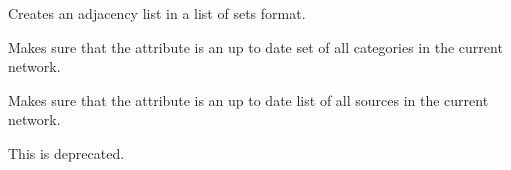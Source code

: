 \documentclass[letterpaper,10pt,english]{sphinxmanual}
\begin{document}
\begin{fulllineitems}
\begin{fulllineitems}
\begin{description}
\end{description}

\end{fulllineitems}


\begin{fulllineitems}
\label{\detokenize{main:pypath.main.PyPath.update_adjlist}}
Creates an adjacency list in a list of sets format.

\end{fulllineitems}


\begin{fulllineitems}
\label{\detokenize{main:pypath.main.PyPath.update_cats}}
Makes sure that the  attribute is an up to date
set of all categories in the current network.

\end{fulllineitems}


\begin{fulllineitems}
\label{\detokenize{main:pypath.main.PyPath.update_db_dict}}
\end{fulllineitems}


\begin{fulllineitems}
\label{\detokenize{main:pypath.main.PyPath.update_sources}}
Makes sure that the  attribute is an up to date
list of all sources in the current network.

\end{fulllineitems}


\begin{fulllineitems}
\label{\detokenize{main:pypath.main.PyPath.update_vindex}}
This is deprecated.


\end{fulllineitems}
\end{fulllineitems}
\end{document}
